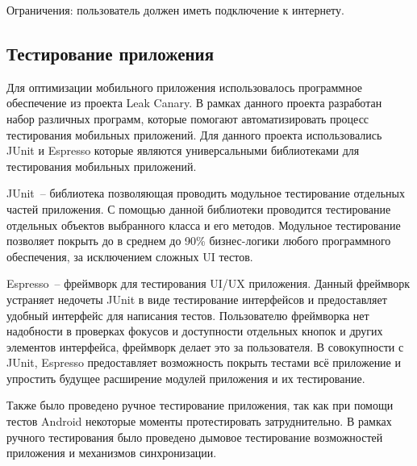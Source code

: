 Ограничения: пользователь должен иметь подключение к интернету.

\subsection{Тестирование приложения}
Для оптимизации мобильного приложения использовалось программное обеспечение из проекта Leak Canary. В рамках данного проекта разработан набор различных программ, которые помогают автоматизировать процесс тестирования мобильных приложений. Для данного проекта использовались JUnit и Espresso которые являются универсальными библиотеками для тестирования мобильных приложений.

JUnit~-- библиотека позволяющая проводить модульное тестирование отдельных частей приложения. С помощью данной библиотеки проводится тестирование отдельных объектов выбранного класса и его методов. Модульное тестирование позволяет покрыть до в среднем до 90\% бизнес-логики любого программного обеспечения, за исключением сложных UI тестов.

Espresso~-- фреймворк для тестирования UI/UX приложения. Данный фреймворк устраняет недочеты JUnit в виде тестирование интерфейсов и предоставляет удобный интерфейс для написания тестов. Пользователю фреймворка нет надобности в проверках фокусов и доступности отдельных кнопок и других элементов интерфейса, фреймворк делает это за пользователя. В совокупности с JUnit, Espresso предоставляет возможность покрыть тестами всё приложение и упростить будущее расширение модулей приложения и их тестирование.
 
Также было проведено ручное тестирование приложения, так как при помощи тестов Android некоторые моменты протестировать затруднительно. В рамках ручного тестирования было проведено дымовое тестирование возможностей приложения и механизмов синхронизации.


